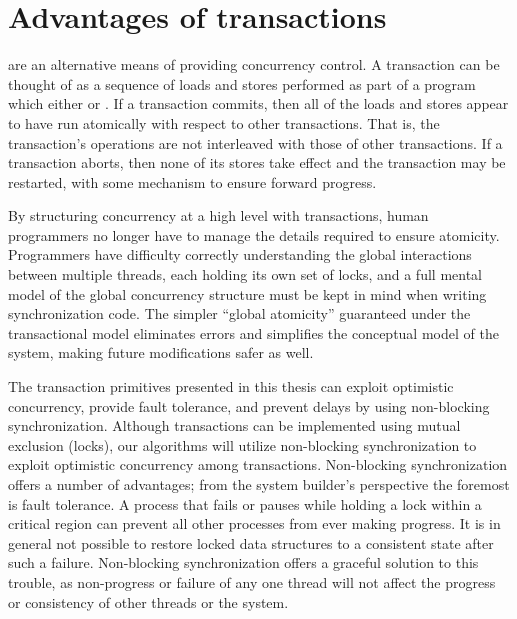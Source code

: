 \section{Advantages of transactions}

 are
an alternative means of providing concurrency control.
A transaction can be thought of as a sequence of loads and stores
performed as part of a program which either
 or .  If a transaction
commits, then all of the loads and stores appear to have run
atomically with respect to other transactions.  That is, the
transaction's operations are not interleaved with those of other
transactions.  If a transaction aborts, then none of its stores take
effect and the transaction may be restarted, with some mechanism to
ensure forward progress.

By structuring concurrency at a high level with transactions, human
programmers no longer have to manage the details required to ensure
atomicity.  Programmers have difficulty correctly understanding the global
interactions between multiple threads, each holding its own set of
locks, and a full mental model of the global concurrency structure
must be kept in mind when writing synchronization code.
The simpler ``global atomicity'' guaranteed under the
transactional model eliminates errors and simplifies the conceptual
model of the system, making future modifications safer as
well.

The transaction primitives presented in this thesis can exploit
optimistic concurrency, provide fault tolerance, and prevent delays by
using non-blocking synchronization.  Although transactions can be
implemented using mutual exclusion (locks), our algorithms will
utilize non-blocking synchronization 
\cite{Lamport77,Herlihy88,HerlihyLuMo03,MassalinPu91,GreenwaldCh96} to
exploit optimistic concurrency among transactions.  Non-blocking
synchronization offers a number of advantages; from the system
builder's perspective the foremost is fault tolerance.  A process that
fails or pauses while holding a lock within a critical region can
prevent all other processes from ever making progress.  It
is in general not possible to restore locked data structures to a
consistent state after such a failure.  Non-blocking synchronization
offers a graceful solution to this trouble, as non-progress or failure
of any one thread will not affect the progress or consistency of other
threads or the system.

